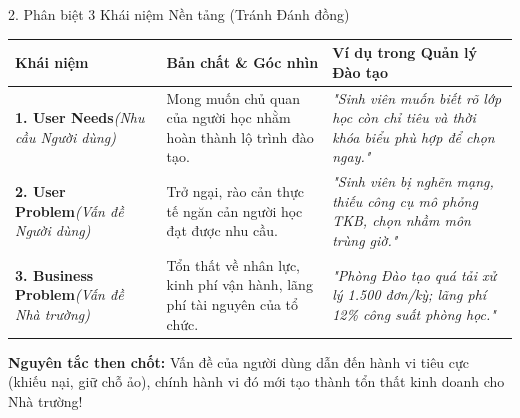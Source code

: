 \documentclass[aspectratio=169, 10pt]{beamer}
\begin{document}
\begin{frame}{2. Phân biệt 3 Khái niệm Nền tảng (Tránh Đánh đồng)}
    \begin{table}[h]
        \centering
        \small
        \begin{tabularx}{\textwidth}{p{3.2cm} X X}
            \toprule
            \textbf{Khái niệm} & \textbf{Bản chất \& Góc nhìn} & \textbf{Ví dụ trong Quản lý Đào tạo} \\
            \midrule
            \textcolor{SoftTeal}{\textbf{1. User Needs}}\newline\textit{(Nhu cầu Người dùng)} & 
            Mong muốn chủ quan của người học nhằm hoàn thành lộ trình đào tạo. & 
            \textit{"Sinh viên muốn biết rõ lớp học còn chỉ tiêu và thời khóa biểu phù hợp để chọn ngay."} \\
            \midrule
            \textcolor{WarmAmber}{\textbf{2. User Problem}}\newline\textit{(Vấn đề Người dùng)} & 
            Trở ngại, rào cản thực tế ngăn cản người học đạt được nhu cầu. & 
            \textit{"Sinh viên bị nghẽn mạng, thiếu công cụ mô phỏng TKB, chọn nhầm môn trùng giờ."} \\
            \midrule
            \textcolor{ThemeNavy}{\textbf{3. Business Problem}}\newline\textit{(Vấn đề Nhà trường)} & 
            Tổn thất về nhân lực, kinh phí vận hành, lãng phí tài nguyên của tổ chức. & 
            \textit{"Phòng Đào tạo quá tải xử lý 1.500 đơn/kỳ; lãng phí 12\% công suất phòng học."} \\
            \bottomrule
        \end{tabularx}
    \end{table}
    
    \vspace{0.1cm}
    \begin{tcolorbox}[colback=CardBg, colframe=MutedSlate]
        \footnotesize \textbf{\textcolor{ThemeNavy}{Nguyên tắc then chốt:}} Vấn đề của người dùng dẫn đến hành vi tiêu cực (khiếu nại, giữ chỗ ảo), chính hành vi đó mới tạo thành tổn thất kinh doanh cho Nhà trường!
    \end{tcolorbox}
\end{frame}
\end{document}
